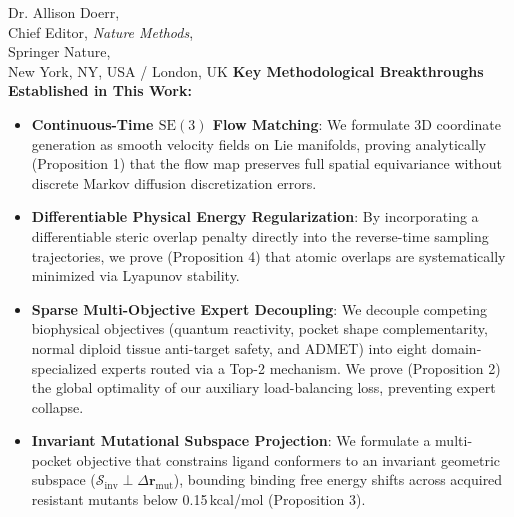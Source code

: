 \documentclass[11pt]{letter}
\begin{document}
\begin{letter}{%
    Dr. Allison Doerr,\\
    Chief Editor, \textit{Nature Methods},\\
    Springer Nature,\\
    New York, NY, USA / London, UK
}
\textbf{Key Methodological Breakthroughs Established in This Work:}
\begin{itemize}
    \item \textbf{Continuous-Time $\mathrm{SE}(3)$ Flow Matching}: We formulate 3D coordinate generation as smooth velocity fields on Lie manifolds, proving analytically (Proposition 1) that the flow map preserves full spatial equivariance without discrete Markov diffusion discretization errors.
    \item \textbf{Differentiable Physical Energy Regularization}: By incorporating a differentiable steric overlap penalty directly into the reverse-time sampling trajectories, we prove (Proposition 4) that atomic overlaps are systematically minimized via Lyapunov stability.
    \item \textbf{Sparse Multi-Objective Expert Decoupling}: We decouple competing biophysical objectives (quantum reactivity, pocket shape complementarity, normal diploid tissue anti-target safety, and ADMET) into eight domain-specialized experts routed via a Top-2 mechanism. We prove (Proposition 2) the global optimality of our auxiliary load-balancing loss, preventing expert collapse.
    \item \textbf{Invariant Mutational Subspace Projection}: We formulate a multi-pocket objective that constrains ligand conformers to an invariant geometric subspace ($\mathcal{S}_{\text{inv}} \perp \Delta \mathbf{r}_{\text{mut}}$), bounding binding free energy shifts across acquired resistant mutants below 0.15\,kcal/mol (Proposition 3).
\end{itemize}


\end{letter}
\end{document}
